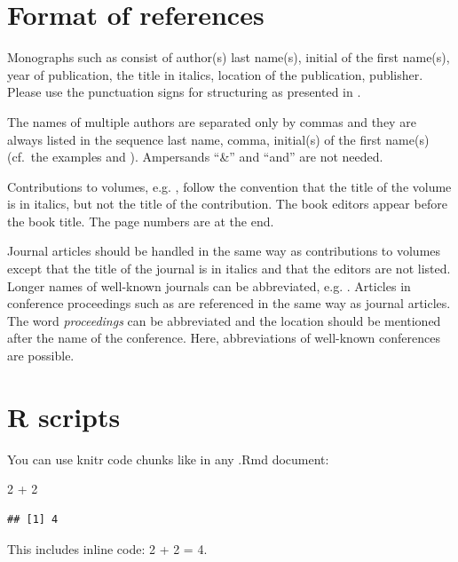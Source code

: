 \documentclass[a4paper,11pt,twocolumn]{article}
\newenvironment{Shaded}{\begin{snugshade}}{\end{snugshade}}
\newcommand{\DecValTok}[1]{\textcolor[rgb]{0.86,0.86,0.80}{#1}}
\newcommand{\OperatorTok}[1]{\textcolor[rgb]{0.94,0.94,0.82}{#1}}
\newcommand{\StringTok}[1]{\textcolor[rgb]{0.80,0.58,0.58}{#1}}
\begin{document}
\section{Format of references}

Monographs such as \cite{Fant:1960} consist of author(s) last name(s),
initial of the first name(s), year of publication, the title in italics,
location of the publication, publisher. Please use the punctuation signs
for structuring as presented in \cite{Fant:1960}.

The names of multiple authors are separated only by commas and they are
always listed in the sequence last name, comma, initial(s) of the first
name(s) (cf.~the examples \cite{Beattie/etal:1982} and
\cite{Peterson/Barney:1952}). Ampersands ``\&'' and ``and'' are not
needed.

Contributions to volumes, e.g. \cite{Stevens:1999}, follow the
convention that the title of the volume is in italics, but not the title
of the contribution. The book editors appear before the book title. The
page numbers are at the end.

Journal articles should be handled in the same way as contributions to
volumes except that the title of the journal is in italics and that the
editors are not listed. Longer names of well-known journals can be
abbreviated, e.g. \cite{Peterson/Barney:1952}. Articles in conference
proceedings such as \cite{Ladefoged:2003} are referenced in the same way
as journal articles. The word \textit{proceedings} can be abbreviated
and the location should be mentioned after the name of the conference.
Here, abbreviations of well-known conferences are possible.

\section{R scripts}

You can use knitr code chunks like in any .Rmd document:

\begin{Shaded}
\begin{Highlighting}[]
\DecValTok{2} \OperatorTok{+}\StringTok{ }\DecValTok{2}
\end{Highlighting}
\end{Shaded}

\begin{verbatim}
## [1] 4
\end{verbatim}

This includes inline code: 2 + 2 = 4.
\end{document}

